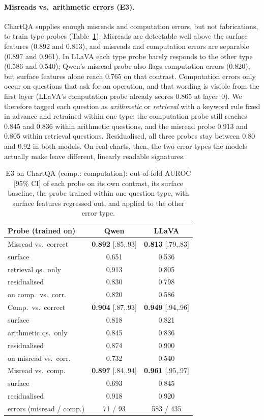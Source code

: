 \paragraph{Misreads vs.\ arithmetic errors (E3).} ChartQA supplies enough
misreads and computation errors, but not fabrications, to train type probes
(Table~\ref{tab:chartqa-types}). Misreads are detectable well above the surface
features (0.892 and 0.813), and misreads and computation errors are separable
(0.897 and 0.961). In LLaVA each type probe barely responds to the other type
(0.586 and 0.540); Qwen's misread probe also flags computation errors (0.820),
but surface features alone reach 0.765 on that contrast. Computation errors only
occur on questions that ask for an operation, and that wording is visible from
the first layer (LLaVA's computation probe already scores 0.865 at layer~0). We
therefore tagged each question as \emph{arithmetic} or \emph{retrieval} with a
keyword rule fixed in advance and retrained within one type: the computation
probe still reaches 0.845 and 0.836 within arithmetic questions, and the misread
probe 0.913 and 0.805 within retrieval questions. Residualised, all three probes
stay between 0.80 and 0.92 in both models. On real charts, then, the two error
types the models actually make leave different, linearly readable signatures.

\begin{table}[t]
\centering\small\setlength{\tabcolsep}{3pt}
\begin{tabular}{lcc}
\toprule
Probe (trained on) & Qwen & LLaVA \\
\midrule
Misread vs.\ correct & \textbf{0.892} {\scriptsize[.85,.93]} & \textbf{0.813} {\scriptsize[.79,.83]} \\
\quad surface & 0.651 & 0.536 \\
\quad retrieval qs.\ only & 0.913 & 0.805 \\
\quad residualised & 0.830 & 0.798 \\
\quad on comp.\ vs.\ corr. & 0.820 & 0.586 \\
Comp.\ vs.\ correct & \textbf{0.904} {\scriptsize[.87,.93]} & \textbf{0.949} {\scriptsize[.94,.96]} \\
\quad surface & 0.818 & 0.821 \\
\quad arithmetic qs.\ only & 0.845 & 0.836 \\
\quad residualised & 0.874 & 0.900 \\
\quad on misread vs.\ corr. & 0.732 & 0.540 \\
Misread vs.\ comp. & \textbf{0.897} {\scriptsize[.84,.94]} & \textbf{0.961} {\scriptsize[.95,.97]} \\
\quad surface & 0.693 & 0.845 \\
\quad residualised & 0.918 & 0.920 \\
\midrule
errors (misread / comp.) & 71 / 93 & 583 / 435 \\
\bottomrule
\end{tabular}
\caption{E3 on ChartQA (comp.: computation): out-of-fold AUROC [95\% CI] of each
probe on its own contrast, its surface baseline, the probe trained within one
question type, with surface features regressed out, and applied to the other
error type.}
\label{tab:chartqa-types}
\end{table}
